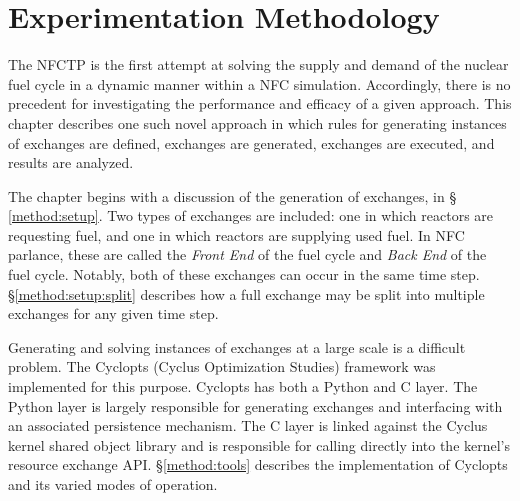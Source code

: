 \chapter{Experimentation Methodology}\label{ch:method}

The NFCTP is the first attempt at solving the supply and demand of the nuclear
fuel cycle in a dynamic manner within a NFC simulation. Accordingly, there is no
precedent for investigating the performance and efficacy of a given
approach. This chapter describes one such novel approach in which rules for
generating instances of exchanges are defined, exchanges are generated,
exchanges are executed, and results are analyzed. 

The chapter begins with a discussion of the generation of exchanges, in \S
\ref{method:setup}. Two types of exchanges are included: one in which reactors
are requesting fuel, and one in which reactors are supplying used fuel. In NFC
parlance, these are called the \textit{Front End} of the fuel cycle and
\textit{Back End} of the fuel cycle. Notably, both of these exchanges can occur
in the same time step. \S \ref{method:setup:split} describes how a full exchange
may be split into multiple exchanges for any given time step. 

Generating and solving instances of exchanges at a large scale is a difficult
problem. The Cyclopts (Cyclus Optimization Studies) framework was implemented
for this purpose. Cyclopts has both a Python and C layer. The Python layer is
largely responsible for generating exchanges and interfacing with an associated
persistence mechanism. The C layer is linked against the Cyclus kernel shared
object library and is responsible for calling directly into the kernel's
resource exchange API. \S \ref{method:tools} describes the implementation of
Cyclopts and its varied modes of operation. 





